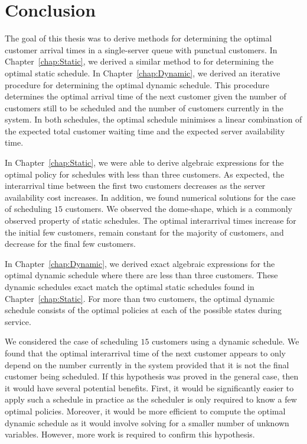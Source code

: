 \chapter{Conclusion}
The goal of this thesis was to derive methods for determining the optimal customer arrival times in a single-server queue with punctual customers. In Chapter~\ref{chap:Static}, we derived a similar method to \citet{Pegden} for determining the optimal static schedule. In Chapter~\ref{chap:Dynamic}, we derived an iterative procedure for determining the optimal dynamic schedule. This procedure determines the optimal arrival time of the next customer given the number of customers still to be scheduled and the number of customers currently in the system. In both schedules, the optimal schedule minimises a linear combination of the expected total customer waiting time and the expected server availability time.

In Chapter~\ref{chap:Static}, we were able to derive algebraic expressions for the optimal policy for schedules with less than three customers. As expected, the interarrival time between the first two customers decreases as the server availability cost increases. In addition, we found numerical solutions for the case of scheduling $15$ customers. We observed the dome-shape, which is a commonly observed property of static schedules. The optimal interarrival times increase for the initial few customers, remain constant for the majority of customers, and decrease for the final few customers.

In Chapter~\ref{chap:Dynamic}, we derived exact algebraic expressions for the optimal dynamic schedule where there are less than three customers. These dynamic schedules exact match the optimal static schedules found in Chapter~\ref{chap:Static}. For more than two customers, the optimal dynamic schedule consists of the optimal policies at each of the possible states during service.

We considered the case of scheduling $15$ customers using a dynamic schedule. We found that the optimal interarrival time of the next customer appears to only depend on the number currently in the system provided that it is not the final customer being scheduled. If this hypothesis was proved in the general case, then it would have several potential benefits. First, it would be significantly easier to apply such a schedule in practice as the scheduler is only required to know a few optimal policies. Moreover, it would be more efficient to compute the optimal dynamic schedule as it would involve solving for a smaller number of unknown variables. However, more work is required to confirm this hypothesis.

